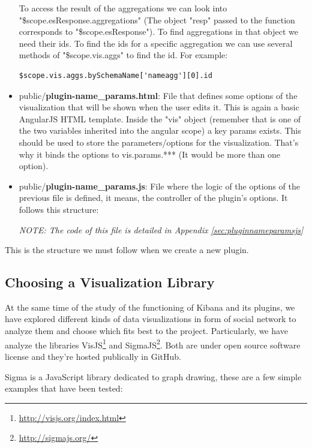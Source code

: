 \documentclass[a4paper, 12pt]{book}
\begin{document}
\begin{itemize}
To access the result of the aggregations we can look into "\$scope.esResponse.aggregations" (The object "resp" passed to the function corresponds to "\$scope.esResponse"). To find aggregations in that object we need their ids. To find the ids for a specific aggregation we can use several methods of "\$scope.vis.aggs" to find the id. For example:

\begin{lstlisting}[frame=single]
$scope.vis.aggs.bySchemaName['nameagg'][0].id
\end{lstlisting}

\item public/\textbf{plugin-name\_params.html}: File that defines some options of the visualization that will be shown when the user edits it. This is again a basic AngularJS HTML template. Inside the "vis" object (remember that is one of the two variables inherited into the angular scope) a key params exists. This should be used to store the parameters/options for the visualization. That’s why it binds the options to vis.params.*** (It would be more than one option).
\item public/\textbf{plugin-name\_params.js}: File where the logic of the options of the previous file is defined, it means, the controller of the plugin’s options. It follows this structure:

\begin{center}
\textit{NOTE: The code of this file is detailed in Appendix \ref{sec:pluginnameparamsjs}}
\end{center}

\end{itemize}

This is the structure we must follow when we create a new plugin.

\subsection{Choosing a Visualization Library}

At the same time of the study of the functioning of Kibana and its plugins, we have explored different kinds of data visualizations in form of social network to analyze them and choose which fits best to the project. Particularly, we have analyze the libraries VisJS\footnote{\url{http://visjs.org/index.html}} and SigmaJS\footnote{\url{http://sigmajs.org/}}. Both are under open source software license and they’re hosted publically in GitHub.

Sigma is a JavaScript library dedicated to graph drawing, these are a few simple examples that have been tested:
\end{document}
